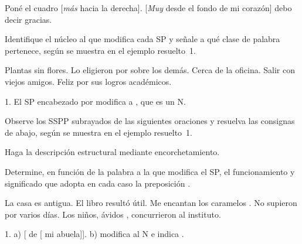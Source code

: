 \begin{exe}
  \ex
    \begin{xlist}
      \ex Poné el cuadro [\textit{más} hacia la derecha].
      \ex {}[\textit{Muy} desde el fondo de mi corazón] debo decir gracias.
    \end{xlist}
\end{exe}

\begin{ejercicio}\label{ej:05-sp-modifica}
Identifique el núcleo al que modifica cada SP y señale a qué clase de palabra
pertenece, según se muestra en el ejemplo resuelto~1.

\begin{exe}
  \ex Plantas sin flores.
  \ex Lo eligieron por sobre los demás.
  \ex Cerca de la oficina.
  \ex Salir con viejos amigos.
  \ex Feliz por sus logros académicos.
\end{exe}

\begin{resuelto}
1. El SP encabezado por  modifica a , que es un N.
\end{resuelto}
\end{ejercicio}

\begin{ejercicio}\label{ej:05-de-sp}
Observe los SSPP subrayados de las siguientes oraciones y resuelva las consignas
de abajo, según se muestra en el ejemplo resuelto~1.

\begin{consignas}
  \item Haga la descripción estructural mediante encorchetamiento.
  \item Determine, en función de la palabra a la que modifica el SP, el
        funcionamiento y significado que adopta en cada caso la preposición
        .
\end{consignas}

\begin{exe}
  \ex La casa  es antigua.
  \ex El libro  resultó útil.
  \ex Me encantan los caramelos .
  \ex No supieron  por varios días.
  \ex Los niños, ávidos , concurrieron al instituto.
\end{exe}

\begin{resuelto}
1. a) [ de [ mi abuela]]. b)
 modifica al N  e indica .
\end{resuelto}
\end{ejercicio}

